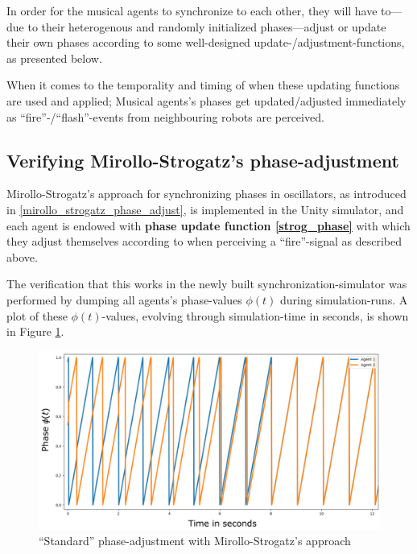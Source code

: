 	In order for the musical agents to synchronize to each other, they will have to—due to their heterogenous and randomly initialized phases—adjust or update their own phases according to some well-designed update-/adjustment-functions, as presented below.
	
	When it comes to the temporality and timing of when these updating functions are used and applied; Musical agents's phases get updated/adjusted immediately as ``fire''-/``flash''-events from neighbouring robots are perceived.
	
	
	
	\subsection{Verifying Mirollo-Strogatz's phase-adjustment} %
	
	Mirollo-Strogatz's approach for synchronizing phases in oscillators, as introduced in \ref{mirollo_strogatz_phase_adjust}, is implemented in the Unity simulator, and each agent is endowed with \textbf{phase update function \eqref{strog_phase}} with which they adjust themselves according to when perceiving a ``fire''-signal as described above.
	
	The verification that this works in the newly built synchronization-simulator was performed by dumping all agents's phase-values $\phi(t)$ during simulation-runs. A plot of these $\phi(t)$-values, evolving through simulation-time in seconds, is shown in Figure \ref{fig:strog_phase}.
	
	\begin{figure}[h]
		\centering
		\includegraphics[width=0.9\linewidth]{Assets/DocSegments/Chapters/Implementation/Figures/Illustrations/MirolloStrogatzPhaseAdjustmentSecondTry.pdf}
		\caption[Illustration of Mirollo-Strogatz's ``standard'' phase-adjustment]{``Standard'' phase-adjustment with Mirollo-Strogatz's approach}
		\label{fig:strog_phase}
	\end{figure}
	
